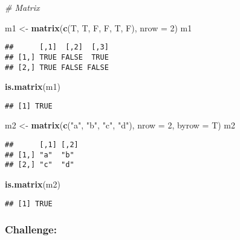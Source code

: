 \documentclass[
]{article}
\newenvironment{Shaded}{\begin{snugshade}}{\end{snugshade}}
\newcommand{\AttributeTok}[1]{\textcolor[rgb]{0.13,0.29,0.53}{#1}}
\newcommand{\CommentTok}[1]{\textcolor[rgb]{0.56,0.35,0.01}{\textit{#1}}}
\newcommand{\DecValTok}[1]{\textcolor[rgb]{0.00,0.00,0.81}{#1}}
\newcommand{\FunctionTok}[1]{\textcolor[rgb]{0.13,0.29,0.53}{\textbf{#1}}}
\newcommand{\NormalTok}[1]{#1}
\newcommand{\OtherTok}[1]{\textcolor[rgb]{0.56,0.35,0.01}{#1}}
\newcommand{\StringTok}[1]{\textcolor[rgb]{0.31,0.60,0.02}{#1}}
\begin{document}
\begin{Shaded}
\begin{Highlighting}[]
\CommentTok{\# Matrix}

\NormalTok{m1 }\OtherTok{\textless{}{-}} \FunctionTok{matrix}\NormalTok{(}\FunctionTok{c}\NormalTok{(T, T, F, F, T, F), }\AttributeTok{nrow =} \DecValTok{2}\NormalTok{)}
\NormalTok{m1}
\end{Highlighting}
\end{Shaded}

\begin{verbatim}
##      [,1]  [,2]  [,3]
## [1,] TRUE FALSE  TRUE
## [2,] TRUE FALSE FALSE
\end{verbatim}

\begin{Shaded}
\begin{Highlighting}[]
\FunctionTok{is.matrix}\NormalTok{(m1)}
\end{Highlighting}
\end{Shaded}

\begin{verbatim}
## [1] TRUE
\end{verbatim}

\begin{Shaded}
\begin{Highlighting}[]
\NormalTok{m2 }\OtherTok{\textless{}{-}} \FunctionTok{matrix}\NormalTok{(}\FunctionTok{c}\NormalTok{(}\StringTok{"a"}\NormalTok{, }\StringTok{"b"}\NormalTok{, }
               \StringTok{"c"}\NormalTok{, }\StringTok{"d"}\NormalTok{), }
               \AttributeTok{nrow =} \DecValTok{2}\NormalTok{,}
               \AttributeTok{byrow =}\NormalTok{ T)}
\NormalTok{m2}
\end{Highlighting}
\end{Shaded}

\begin{verbatim}
##      [,1] [,2]
## [1,] "a"  "b" 
## [2,] "c"  "d"
\end{verbatim}

\begin{Shaded}
\begin{Highlighting}[]
\FunctionTok{is.matrix}\NormalTok{(m2)}
\end{Highlighting}
\end{Shaded}

\begin{verbatim}
## [1] TRUE
\end{verbatim}

\subsubsection{Challenge:}\label{challenge-1}
\end{document}
